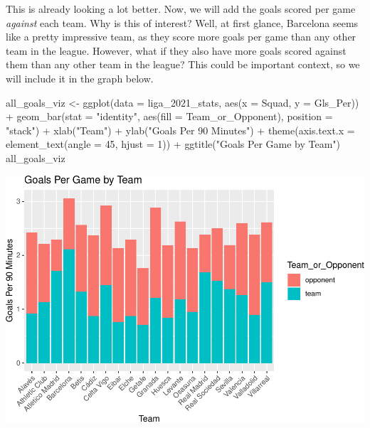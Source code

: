 \documentclass[
  11pt,
]{book}
\newenvironment{Shaded}{\begin{snugshade}}{\end{snugshade}}
\newcommand{\AttributeTok}[1]{\textcolor[rgb]{0.77,0.63,0.00}{#1}}
\newcommand{\DecValTok}[1]{\textcolor[rgb]{0.00,0.00,0.81}{#1}}
\newcommand{\FunctionTok}[1]{\textcolor[rgb]{0.00,0.00,0.00}{#1}}
\newcommand{\NormalTok}[1]{#1}
\newcommand{\OtherTok}[1]{\textcolor[rgb]{0.56,0.35,0.01}{#1}}
\newcommand{\SpecialCharTok}[1]{\textcolor[rgb]{0.00,0.00,0.00}{#1}}
\newcommand{\StringTok}[1]{\textcolor[rgb]{0.31,0.60,0.02}{#1}}
\theoremstyle{definition}
\theoremstyle{definition}
\theoremstyle{definition}
\theoremstyle{definition}
\theoremstyle{remark}
\begin{document}
This is already looking a lot better. Now, we will add the goals scored per game \emph{against} each team. Why is this of interest? Well, at first glance, Barcelona seems like a pretty impressive team, as they score more goals per game than any other team in the league. However, what if they also have more goals scored against them than any other team in the league? This could be important context, so we will include it in the graph below.

\begin{Shaded}
\begin{Highlighting}[]
\NormalTok{all\_goals\_viz }\OtherTok{\textless{}{-}} \FunctionTok{ggplot}\NormalTok{(}\AttributeTok{data =}\NormalTok{ liga\_2021\_stats, }\FunctionTok{aes}\NormalTok{(}\AttributeTok{x =}\NormalTok{ Squad, }\AttributeTok{y =}\NormalTok{ Gls\_Per)) }\SpecialCharTok{+} \FunctionTok{geom\_bar}\NormalTok{(}\AttributeTok{stat =} \StringTok{"identity"}\NormalTok{,}
    \FunctionTok{aes}\NormalTok{(}\AttributeTok{fill =}\NormalTok{ Team\_or\_Opponent), }\AttributeTok{position =} \StringTok{"stack"}\NormalTok{) }\SpecialCharTok{+} \FunctionTok{xlab}\NormalTok{(}\StringTok{"Team"}\NormalTok{) }\SpecialCharTok{+} \FunctionTok{ylab}\NormalTok{(}\StringTok{"Goals Per 90 Minutes"}\NormalTok{) }\SpecialCharTok{+}
    \FunctionTok{theme}\NormalTok{(}\AttributeTok{axis.text.x =} \FunctionTok{element\_text}\NormalTok{(}\AttributeTok{angle =} \DecValTok{45}\NormalTok{, }\AttributeTok{hjust =} \DecValTok{1}\NormalTok{)) }\SpecialCharTok{+} \FunctionTok{ggtitle}\NormalTok{(}\StringTok{"Goals Per Game by Team"}\NormalTok{)}
\NormalTok{all\_goals\_viz}
\end{Highlighting}
\end{Shaded}

\includegraphics{series_files/figure-latex/unnamed-chunk-14-1.pdf}
\end{document}
